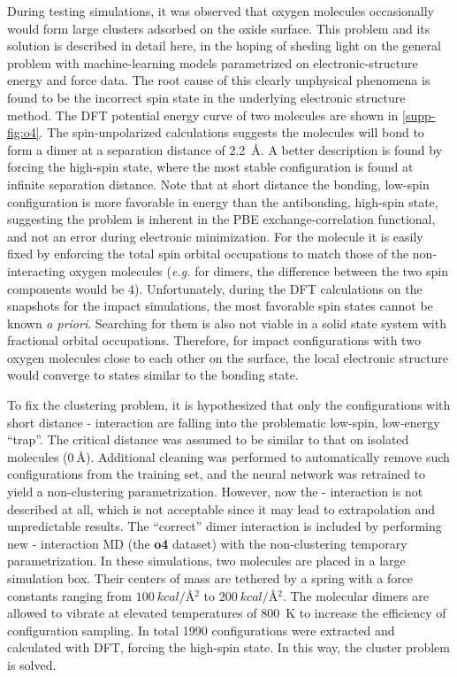 \documentclass[manuscript=cmatex]{achemso}
\begin{document}
During testing simulations, it was observed that oxygen molecules occasionally would form large clusters adsorbed on the oxide surface. This problem and its solution is described in detail here, in the hoping of sheding light on the general problem with machine-learning models parametrized on electronic-structure energy and force data. The root cause of this clearly unphysical phenomena is found to be the incorrect spin state in the underlying electronic structure method. The DFT potential energy curve of two  molecules are shown in \cref{supp-fig:o4}. The spin-unpolarized calculations suggests the molecules will bond to form a  dimer at a separation distance of \SI{2.2}{\AA}. A better description is found by forcing the high-spin state, where the most stable configuration is found at infinite separation distance. Note that at short distance the bonding, low-spin configuration is more favorable in energy than the antibonding, high-spin state, suggesting the problem is inherent in the PBE exchange-correlation functional, and not an error during electronic minimization. For the molecule it is easily fixed by enforcing the total spin orbital occupations to match those of the non-interacting oxygen molecules (\textit{e.g.} for dimers, the difference between the two spin components would be 4). Unfortunately, during the DFT calculations on the snapshots for the impact simulations, the most favorable spin states cannot be known \textit{a priori}. Searching for them is also not viable in a solid state system with fractional orbital occupations. Therefore, for impact configurations with two oxygen molecules close to each other on the surface, the local electronic structure would converge to states similar to the bonding state. 

To fix the clustering problem, it is hypothesized that only the configurations with short distance - interaction are falling into the problematic low-spin, low-energy ``trap''. The critical distance was assumed to be similar to that on isolated molecules (\textbf{$\SI{0}{\angstrom}$}). Additional cleaning was performed to automatically remove such configurations from the training set, and the neural network was retrained to yield a non-clustering parametrization. However, now the - interaction is not described at all, which is not acceptable since it may lead to extrapolation and unpredictable results. The ``correct'' dimer interaction is included by performing new - interaction MD (the \textbf{o4} dataset) with the non-clustering temporary parametrization. In these simulations, two  molecules are placed in a large simulation box. Their centers of mass are tethered by a spring with a force constants ranging from $\SI{100}{kcal/\angstrom^2}$ to $\SI{200}{kcal/\angstrom^2}$. The molecular dimers are allowed to vibrate at elevated temperatures of \SI{800}{K} to increase the efficiency of configuration sampling. In total 1990 configurations were extracted and calculated with DFT, forcing the high-spin state. In this way, the cluster problem is solved.
\end{document}
